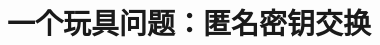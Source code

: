 \section{一个玩具问题：匿名密钥交换}\label{sec:10-1}

\begin{game}[匿名密钥交换]\label{game:10-1}
	
\end{game}

\begin{definition}\label{def:10-1}
	
\end{definition}